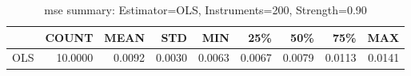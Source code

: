 \begin{table}[ht]
\centering
\caption{mse summary: Estimator=OLS, Instruments=200, Strength=0.90}
\begin{tabular}{lrrrrrrrr}
\toprule
 & COUNT & MEAN & STD & MIN & 25\% & 50\% & 75\% & MAX \\
\midrule
OLS & 10.0000 & 0.0092 & 0.0030 & 0.0063 & 0.0067 & 0.0079 & 0.0113 & 0.0141 \\
\bottomrule
\end{tabular}
\end{table}

